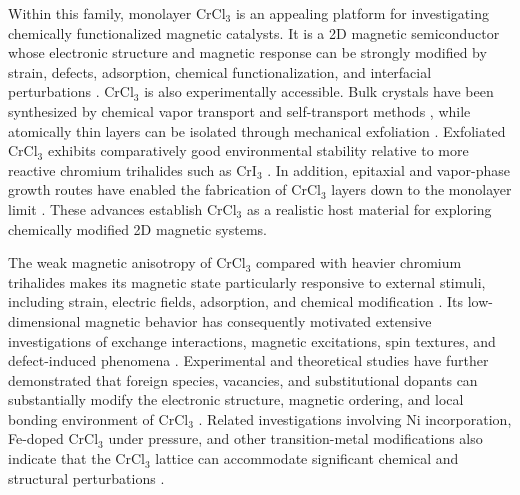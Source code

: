 \documentclass[journal=jacsat,manuscript=article]{achemso}
\begin{document}
Within this family, monolayer CrCl$_3$ is an appealing platform for investigating chemically functionalized magnetic catalysts. It is a 2D magnetic semiconductor whose electronic structure and magnetic response can be strongly modified by strain, defects, adsorption, chemical functionalization, and interfacial perturbations \cite{Xue2019,Webster2018,Dupont2021,Zhu2025}. CrCl$_3$ is also experimentally accessible. Bulk crystals have been synthesized by chemical vapor transport and self-transport methods \cite{Abdel-Hafiez2025,Mastrippolito2021}, while atomically thin layers can be isolated through mechanical exfoliation \cite{Kazim_2020}. Exfoliated CrCl$_3$ exhibits comparatively good environmental stability relative to more reactive chromium trihalides such as CrI$_3$ \cite{Mastrippolito2021}. In addition, epitaxial and vapor-phase growth routes have enabled the fabrication of CrCl$_3$ layers down to the monolayer limit \cite{Bedoya2021,Wang2022}. These advances establish CrCl$_3$ as a realistic host material for exploring chemically modified 2D magnetic systems.

The weak magnetic anisotropy of CrCl$_3$ compared with heavier chromium trihalides makes its magnetic state particularly responsive to external stimuli, including strain, electric fields, adsorption, and chemical modification \cite{Webster2018,Ebrahimian2023,Esteras2023}. Its low-dimensional magnetic behavior has consequently motivated extensive investigations of exchange interactions, magnetic excitations, spin textures, and defect-induced phenomena \cite{Sarkar2021,Stagraczynski2024,Esquembre-Kucukalic2025,Lu2020,Mastrippolito2021}. Experimental and theoretical studies have further demonstrated that foreign species, vacancies, and substitutional dopants can substantially modify the electronic structure, magnetic ordering, and local bonding environment of CrCl$_3$ \cite{Luo2020,Gao2018,Mastrippolito2021,Mastrippolito2022}. Related investigations involving Ni incorporation, Fe-doped CrCl$_3$ under pressure, and other transition-metal modifications also indicate that the CrCl$_3$ lattice can accommodate significant chemical and structural perturbations \cite{Wang2019,Abdel-Hafiez2025,Safi2023}.

\end{document}
